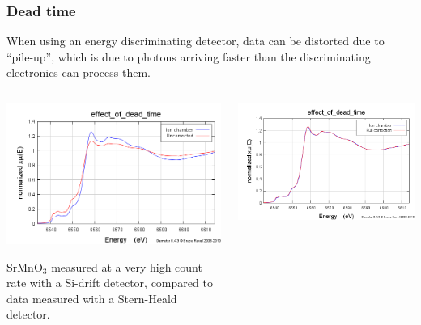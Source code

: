 \documentclass[10pt, xcolor=x11names, compress]{beamer}
\begin{document}
\begin{frame}
  \frametitle{Dead time}

  \small
  When using an energy discriminating detector, data can be distorted
  due to ``pile-up'', which is due to photons arriving faster than the
  discriminating electronics can process them.
  \begin{columns}[T]
    \begin{column}{0.5\linewidth}
      \begin{center}
        \includegraphics[width=0.9\linewidth]{images/deadtime.png}

        SrMnO$_3$ measured at a very high count rate with a
        {\color{Red2}Si-drift detector}, compared to data measured
        with {\color{Blue2}a Stern-Heald detector}.
      \end{center}
    \end{column}
    \begin{column}{0.5\linewidth}
      \begin{center}
        \includegraphics[width=0.9\linewidth]{images/deadtime_corrected.png}


\end{center}
\end{column}
\end{columns}
\end{frame}
\end{document}

